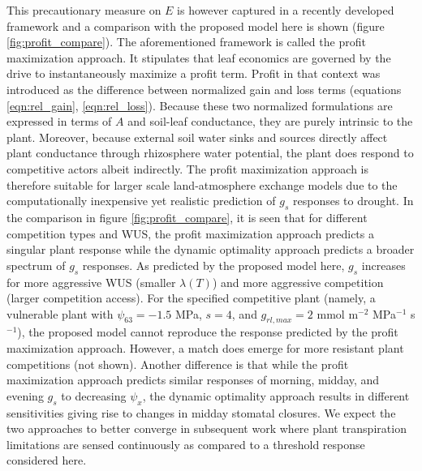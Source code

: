 \documentclass[utf8]{frontiersSCNS} %
\begin{document}
This precautionary measure on $E$ is however captured in a recently developed framework \citep{sperry_pragmatic_2016, sperry_predicting_2017} and a comparison with the proposed model here is shown (figure \ref{fig:profit_compare}). The aforementioned framework is called the profit maximization approach. It stipulates that leaf economics are governed by the drive to instantaneously maximize a profit term. Profit in that context was introduced as the difference between normalized gain and loss terms (equations \ref{eqn:rel_gain}, \ref{eqn:rel_loss}). Because these two normalized formulations are expressed in terms of $A$ and soil-leaf conductance, they are purely intrinsic to the plant. Moreover, because external soil water sinks and sources directly affect plant conductance through rhizosphere water potential, the plant does respond to competitive actors albeit indirectly. The profit maximization approach is therefore suitable for larger scale land-atmosphere exchange models due to the computationally inexpensive yet realistic prediction of $g_s$ responses to drought. In the comparison in figure \ref{fig:profit_compare}, it is seen that for different competition types and WUS, the profit maximization approach predicts a singular plant response while the dynamic optimality approach predicts a broader spectrum of $g_s$ responses. As predicted by the proposed model here, $g_s$ increases for more aggressive WUS (smaller $\lambda(T)$) and more aggressive competition (larger competition access). For the specified competitive plant (namely, a vulnerable plant with $\psi_{63} = -1.5$ MPa, $s=4$, and $g_{rl,max} = 2$ mmol m$^{-2}$ MPa$^{-1}$ s$^{-1}$), the proposed model cannot reproduce the response predicted by the profit maximization approach. However, a match does emerge for more resistant plant competitions (not shown). Another difference is that while the profit maximization approach predicts similar responses of morning, midday, and evening $g_s$ to decreasing $\psi_x$, the dynamic optimality approach results in different sensitivities giving rise to changes in midday stomatal closures. We expect the two approaches to better converge in subsequent work where plant transpiration limitations are sensed continuously as compared to a threshold response considered here.
\end{document}
